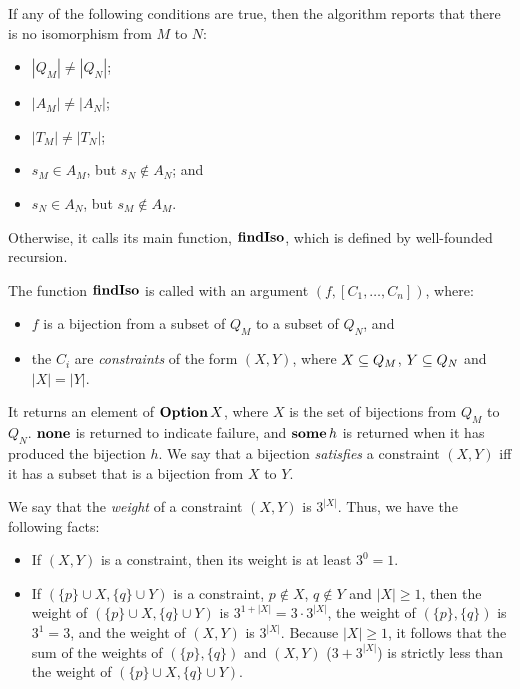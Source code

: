 If any of the following conditions are true, then the algorithm reports
that there is no isomorphism from $M$ to $N$:
\begin{itemize}
\item $|Q_M|\neq|Q_N|$;

\item $|A_M|\neq|A_N|$;

\item $|T_M|\neq|T_N|$;

\item $s_M\in A_M$, but $s_N\not\in A_N$; and

\item $s_N\in A_N$, but $s_M\not\in A_M$.
\end{itemize}
Otherwise, it calls its main function, $\mathbf{findIso}$, which is
defined by well-founded recursion.

The function $\mathbf{findIso}$ is called with an argument $(f,
[C_1,\ldots,C_n])$, where:
\begin{itemize}
\item $f$ is a bijection from a subset of $Q_M$ to a subset of $Q_N$, and

\item the $C_i$ are \emph{constraints} of the form $(X,Y)$, where
  $X\subseteq Q_M$, $Y\subseteq Q_N$ and $|X|=|Y|$.
\end{itemize}
It returns an element of $\mathbf{Option}\,X$, where $X$ is the set of
bijections from $Q_M$ to $Q_N$.  $\mathbf{none}$ is returned to indicate
failure, and $\mathbf{some}\,h$ is returned when it has produced the bijection $h$.
We say that a bijection \emph{satisfies} a constraint $(X,Y)$ iff it
has a subset that is a bijection from $X$ to $Y$.

We say that the \emph{weight} of a constraint $(X,Y)$ is $3^{|X|}$.
Thus, we have the following facts:
\begin{itemize}
\item If $(X,Y)$ is a constraint, then its weight is at least $3^0=1$.

\item If $(\{p\}\cup X,\{q\}\cup Y)$ is a constraint, $p\not\in X$,
  $q\not\in Y$ and $|X|\geq 1$, then the weight of $(\{p\}\cup
  X,\{q\}\cup Y)$ is $3^{1+|X|}=3\cdot 3^{|X|}$, the weight of
  $(\{p\},\{q\})$ is $3^1=3$, and the weight of $(X,Y)$ is $3^{|X|}$.
  Because $|X|\geq 1$, it follows that the sum of the weights of
  $(\{p\},\{q\})$ and $(X,Y)$ ($3 + 3^{|X|}$) is strictly less than
  the weight of $(\{p\}\cup X,\{q\}\cup Y)$.
\end{itemize}

